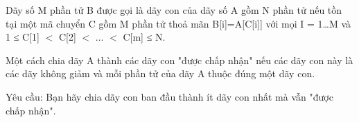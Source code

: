 Dãy số M phần tử B được gọi là dãy con của dãy số A gồm N phần tử nếu tồn tại một mã chuyển C gồm M phần tử thoả mãn B[i]=A[C[i]] với mọi I = 1…M và 1 ≤ C[1] $<$ C[2] $<$ ... $<$ C[m] ≤ N.  

   Một cách chia dãy A thành các dãy con "được chấp nhận" nếu các dãy con này là các dãy không giảm và mỗi phần tử của dãy A thuộc đúng một dãy con.  

   Yêu cầu: Bạn hãy chia dãy con ban đầu thành ít dãy con nhất mà vẫn "được chấp nhận".  

\